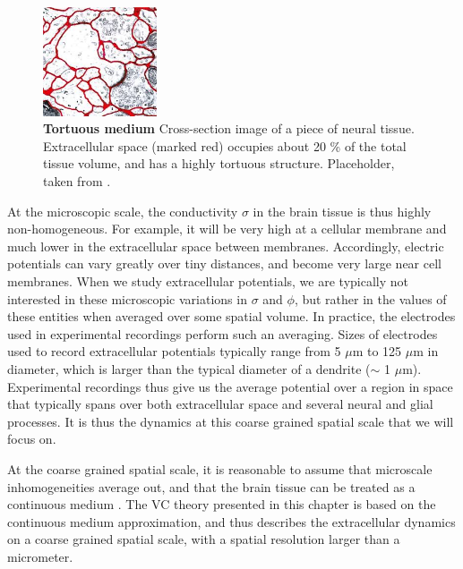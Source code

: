 \begin{figure}[!ht]
\begin{center}
\includegraphics[width=0.3\textwidth]{Figures/VC/ECSdummy.jpeg}
\end{center}
\caption{\textbf{Tortuous medium}  Cross-section image of a piece of neural tissue. Extracellular space (marked red) occupies about 20 \% of the total tissue volume, and has a highly tortuous structure. Placeholder, taken from \citep{Sykova2008}.
}
\label{VC:fig:ECS}
\end{figure}

At the microscopic scale, the conductivity  $\sigma$ in the brain tissue is thus highly non-homogeneous. For example, it will be very high at a cellular membrane and much lower in the extracellular space between membranes. Accordingly, electric potentials can vary greatly over tiny distances, and become very large near cell membranes. When we study extracellular potentials, we are typically not interested in these microscopic variations in $\sigma$ and $\phi$, but rather in the values of these entities when averaged over some spatial volume. In practice, the electrodes used in experimental recordings perform such an averaging. Sizes of electrodes used to record extracellular potentials typically range from 5 $\mu$m to 125 $\mu$m in diameter\citep{Viswam2019}, which is larger than the typical diameter of a dendrite ($\sim$ 1 $\mu$m). Experimental recordings thus give us the average potential over a region in space that typically spans over both extracellular space and several neural and glial processes. It is thus the dynamics at this coarse grained spatial scale that we will focus on.

At the coarse grained spatial scale, it is reasonable to assume that microscale inhomogeneities average out, and that the brain tissue can be treated as a continuous medium \citep{Gratiy2017}. The VC theory presented in this chapter is based on the continuous medium approximation, and thus describes the extracellular dynamics on a coarse grained spatial scale, with a spatial resolution larger than a micrometer. 

